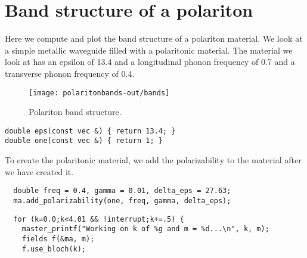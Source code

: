 \section{Band structure of a polariton}

\begin{comment}
#include <stdio.h>
#include <stdlib.h>

#include <meep.h>
using namespace meep;

const double rmax = 1.0;
\end{comment}

Here we compute and plot the band structure of a polariton material.  We
look at a simple metallic waveguide filled with a polaritonic material.
The material we look at has an epsilon of 13.4 and a longitudinal phonon
frequency of 0.7 and a transverse phonon frequency of 0.4.

\begin{figure}
\label{polaritonbands}
\caption{Polariton band structure.}
\texttt{[image: polaritonbands-out/bands]}
\end{figure}

\begin{verbatim}
double eps(const vec &) { return 13.4; }
double one(const vec &) { return 1; }
\end{verbatim}

\begin{comment}
int main(int argc, char **argv) {
  initialize mpi(argc, argv);
  deal_with_ctrl_c();
  const int a = 10;
  const int m = 0;
  double k;
  const double ttot = 1000;  
\end{comment}

\begin{comment}
  mat ma(volcyl(rmax, 0.0, a), eps);
  const char *dirname = make_output_directory(__FILE__);
  ma.set_output_directory(dirname);
  grace g("bands", dirname);
  g.set_range(0.0, 4.0, 0.0, 1.1);
\end{comment}

To create the polaritonic material, we add the polarizability to the
material after we have created it.

\begin{verbatim}
  double freq = 0.4, gamma = 0.01, delta_eps = 27.63;
  ma.add_polarizability(one, freq, gamma, delta_eps);
\end{verbatim}

\begin{verbatim}
  for (k=0.0;k<4.01 && !interrupt;k+=.5) {
    master_printf("Working on k of %g and m = %d...\n", k, m);
    fields f(&ma, m);
    f.use_bloch(k);
\end{verbatim}

